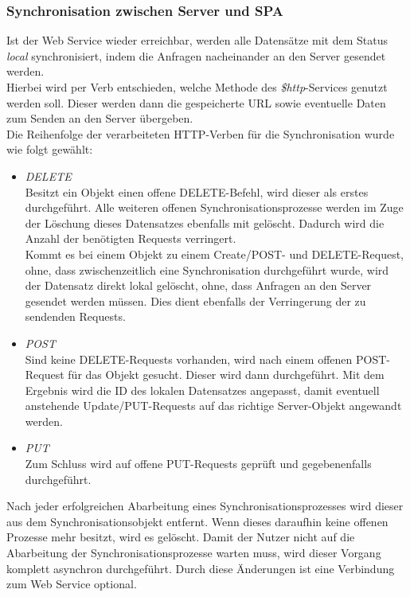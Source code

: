 {\subsubsection*{Synchronisation zwischen Server und SPA}
\label{ssec:Sync-SPA}
Ist der Web Service wieder erreichbar, werden alle Datensätze mit dem Status \textit{local} synchronisiert, indem die Anfragen nacheinander an den Server gesendet werden. \\Hierbei wird per Verb entschieden, welche Methode des \textit{\$http}-Services genutzt werden soll. Dieser werden dann die gespeicherte URL sowie eventuelle Daten zum Senden an den Server übergeben. \\
Die Reihenfolge der verarbeiteten \ac{HTTP}-Verben für die Synchronisation wurde wie folgt gewählt:
\begin{itemize}
\item \textit{DELETE}\\
Besitzt ein Objekt einen offene DELETE-Befehl, wird dieser als erstes durchgeführt. Alle weiteren offenen Synchronisationsprozesse werden im Zuge der Löschung dieses Datensatzes ebenfalls mit gelöscht. Dadurch wird die Anzahl der benötigten Requests verringert. \\Kommt es bei einem Objekt zu einem Create/POST- und DELETE-Request, ohne, dass zwischenzeitlich eine Synchronisation durchgeführt wurde, wird der Datensatz direkt lokal gelöscht, ohne, dass Anfragen an den Server gesendet werden müssen. Dies dient ebenfalls der Verringerung der zu sendenden Requests. 
\item \textit{POST} \\
Sind keine DELETE-Requests vorhanden, wird nach einem offenen POST-Request für das Objekt gesucht. Dieser wird dann durchgeführt. Mit dem Ergebnis wird die ID des lokalen Datensatzes angepasst, damit eventuell anstehende Update/PUT-Requests auf das richtige Server-Objekt angewandt werden.
\item \textit{PUT} \\
Zum Schluss wird auf offene PUT-Requests geprüft und gegebenenfalls durchgeführt. 
\end{itemize}
Nach jeder erfolgreichen Abarbeitung eines Synchronisationsprozesses wird dieser aus dem Synchronisationsobjekt entfernt. Wenn dieses daraufhin keine offenen Prozesse mehr besitzt, wird es gelöscht. 
Damit der Nutzer nicht auf die Abarbeitung der Synchronisationsprozesse warten muss, wird dieser Vorgang komplett asynchron durchgeführt. Durch diese Änderungen ist eine Verbindung zum Web Service optional.

}
